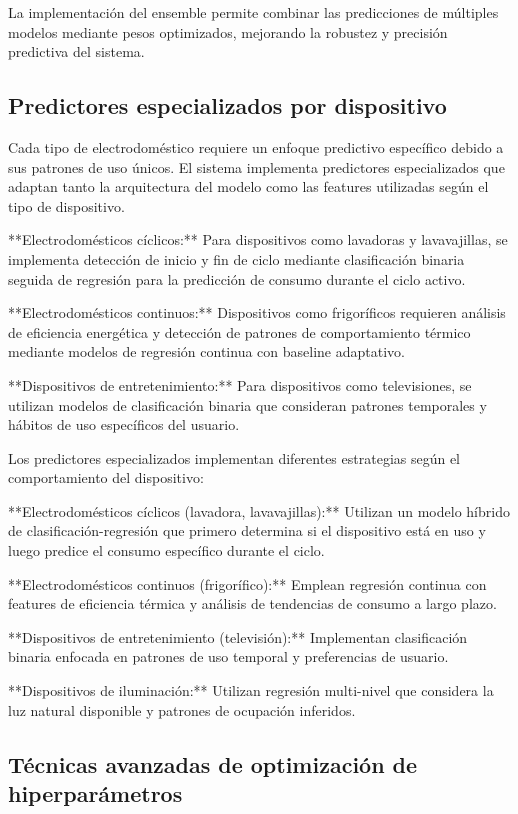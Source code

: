 La implementación del ensemble permite combinar las predicciones de múltiples modelos mediante pesos optimizados, mejorando la robustez y precisión predictiva del sistema.

\subsection{Predictores especializados por dispositivo}

Cada tipo de electrodoméstico requiere un enfoque predictivo específico debido a sus patrones de uso únicos. El sistema implementa predictores especializados que adaptan tanto la arquitectura del modelo como las features utilizadas según el tipo de dispositivo.

**Electrodomésticos cíclicos:** Para dispositivos como lavadoras y lavavajillas, se implementa detección de inicio y fin de ciclo mediante clasificación binaria seguida de regresión para la predicción de consumo durante el ciclo activo.

**Electrodomésticos continuos:** Dispositivos como frigoríficos requieren análisis de eficiencia energética y detección de patrones de comportamiento térmico mediante modelos de regresión continua con baseline adaptativo.

**Dispositivos de entretenimiento:** Para dispositivos como televisiones, se utilizan modelos de clasificación binaria que consideran patrones temporales y hábitos de uso específicos del usuario.

Los predictores especializados implementan diferentes estrategias según el comportamiento del dispositivo:

**Electrodomésticos cíclicos (lavadora, lavavajillas):** Utilizan un modelo híbrido de clasificación-regresión que primero determina si el dispositivo está en uso y luego predice el consumo específico durante el ciclo.

**Electrodomésticos continuos (frigorífico):** Emplean regresión continua con features de eficiencia térmica y análisis de tendencias de consumo a largo plazo.

**Dispositivos de entretenimiento (televisión):** Implementan clasificación binaria enfocada en patrones de uso temporal y preferencias de usuario.

**Dispositivos de iluminación:** Utilizan regresión multi-nivel que considera la luz natural disponible y patrones de ocupación inferidos.

\subsection{Técnicas avanzadas de optimización de hiperparámetros}

